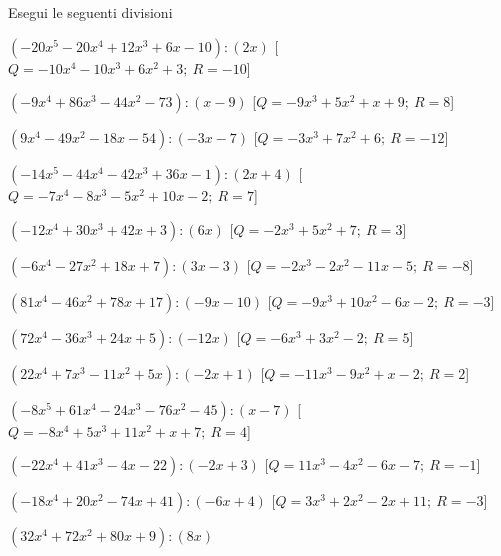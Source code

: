 \begin{esercizio}\label{ese:}
 Esegui le seguenti divisioni
 \begin{enumeratea}
  \item  \(\left(-20 x^5 -20 x^4 +12 x^3 +6 x -10 \right) : \left(2 x  \right)\)
   \hfill [\(Q = -10 x^4 -10 x^3 +6 x^2 +3;~R = -10\)]
  \item  \(\left(-9 x^4 +86 x^3 -44 x^2 -73 \right) : \left(x -9 \right)\)
   \hfill [\(Q = -9 x^3 +5 x^2 + x +9;~R = 8\)]
  \item  \(\left(9 x^4 -49 x^2 -18 x -54 \right) : \left(-3 x -7 \right)\)
   \hfill [\(Q = -3 x^3 +7 x^2 +6;~R = -12\)]
  \item  \(\left(-14 x^5 -44 x^4 -42 x^3 +36 x -1 \right) : \left(2 x +4 
\right)\)
   \hfill [\(Q = -7 x^4 -8 x^3 -5 x^2 +10 x -2;~R = 7\)]
  \item  \(\left(-12 x^4 +30 x^3 +42 x +3 \right) : \left(6 x  \right)\)
   \hfill [\(Q = -2 x^3 +5 x^2 +7;~R = 3\)]
  \item  \(\left(-6 x^4 -27 x^2 +18 x +7 \right) : \left(3 x -3 \right)\)
   \hfill [\(Q = -2 x^3 -2 x^2 -11 x -5;~R = -8\)]
  \item  \(\left(81 x^4 -46 x^2 +78 x +17 \right) : \left(-9 x -10 \right)\)
   \hfill [\(Q = -9 x^3 +10 x^2 -6 x -2;~R = -3\)]
  \item  \(\left(72 x^4 -36 x^3 +24 x +5 \right) : \left(-12 x  \right)\)
   \hfill [\(Q = -6 x^3 +3 x^2 -2;~R = 5\)]
  \item  \(\left(22 x^4 +7 x^3 -11 x^2 +5 x  \right) : \left(-2 x +1 \right)\)
   \hfill [\(Q = -11 x^3 -9 x^2 + x -2;~R = 2\)]
  \item  \(\left(-8 x^5 +61 x^4 -24 x^3 -76 x^2 -45 \right) : \left(x -7 
\right)\)
   \hfill [\(Q = -8 x^4 +5 x^3 +11 x^2 + x +7;~R = 4\)]
  \item  \(\left(-22 x^4 +41 x^3 -4 x -22 \right) : \left(-2 x +3 \right)\)
   \hfill [\(Q = 11 x^3 -4 x^2 -6 x -7;~R = -1\)]
  \item  \(\left(-18 x^4 +20 x^2 -74 x +41 \right) : \left(-6 x +4 \right)\)
   \hfill [\(Q = 3 x^3 +2 x^2 -2 x +11;~R = -3\)]
  \item  \(\left(32 x^4 +72 x^2 +80 x +9 \right) : \left(8 x  \right)\)

\end{enumeratea}
\end{esercizio}
